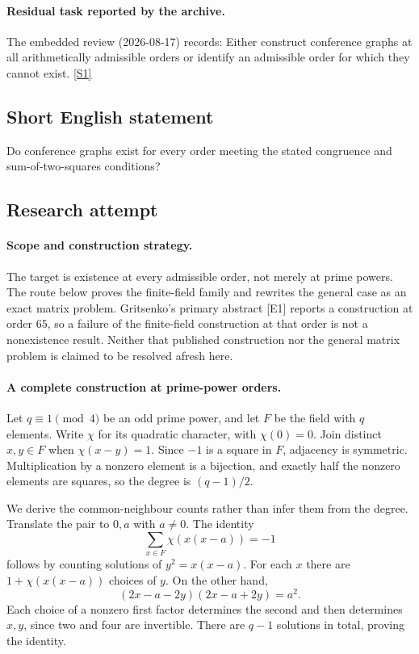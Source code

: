 \documentclass[11pt,a4paper]{article}
\newcommand{\sref}[2]{\hyperlink{source:#1:#2}{[S#2]}}
\begin{document}
\paragraph{Residual task reported by the archive.}

The embedded review (2026-08-17) records: Either construct conference graphs at all arithmetically admissible orders or identify an admissible order for which they cannot exist. \sref{1410}{1}

\subsection{Short English statement}

Do conference graphs exist for every order meeting the stated congruence and sum-of-two-squares conditions?

\subsection{Research attempt}

\paragraph{Scope and construction strategy.}
The target is existence at every admissible order, not merely at prime
powers. The route below proves the finite-field family and rewrites the
general case as an exact matrix problem. Gritsenko's primary abstract
[E1] reports a construction at order $65$, so a failure of the
finite-field construction at that order is not a nonexistence result.
Neither that published construction nor the general matrix problem is
claimed to be resolved afresh here.

\paragraph{A complete construction at prime-power orders.}
Let $q\equiv1\pmod4$ be an odd prime power, and let $F$ be the field
with $q$ elements. Write $\chi$ for its quadratic character, with
$\chi(0)=0$. Join distinct $x,y\in F$ when $\chi(x-y)=1$.
Since $-1$ is a square in $F$, adjacency is symmetric. Multiplication
by a nonzero element is a bijection, and exactly half the nonzero
elements are squares, so the degree is $(q-1)/2$.

We derive the common-neighbour counts rather than infer them from the
degree. Translate the pair to $0,a$ with $a\ne0$. The identity
\[
               \sum_{x\in F}\chi(x(x-a))=-1
\]
follows by counting solutions of $y^2=x(x-a)$. For each $x$ there
are $1+\chi(x(x-a))$ choices of $y$. On the other hand,
\[
               (2x-a-2y)(2x-a+2y)=a^2.
\]
Each choice of a nonzero first factor determines the second and then
determines $x,y$, since two and four are invertible. There are $q-1$
solutions in total, proving the identity.
\end{document}
